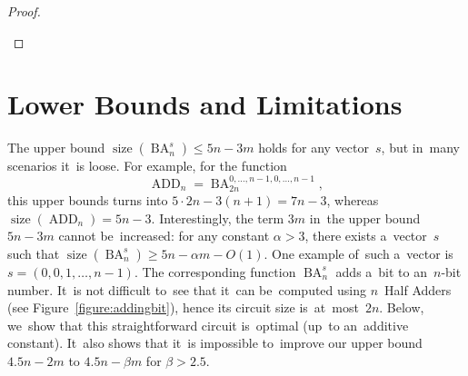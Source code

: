 \documentclass[sigconf, review, anonymous]{acmart}
\DeclareMathOperator{\ADD}{ADD}
\DeclareMathOperator{\BA}{BA}
\DeclareMathOperator{\size}{size}
\begin{document}
\begin{proof}
\begin{enumerate}
\begin{center}
        \end{center}
    \end{enumerate}
\end{proof}


\section{Lower Bounds and Limitations}
The upper bound $\size(\BA_n^s) \le 5n-3m$ holds for any vector~$s$, but 
in~many scenarios it~is loose. For example, for the function
\[\ADD_n=\BA_{2n}^{0,\dotsc,n-1,0,\dotsc,n-1},\]
this upper bounds turns into $5\cdot 2n-3(n+1)=7n-3$,
whereas $\size(\ADD_n)=5n-3$. Interestingly, the term $3m$ in~the upper bound $5n-3m$ cannot be~increased: for any constant $\alpha > 3$, there exists 
a~vector~$s$ such that $\size(\BA_n^s) \ge 5n-\alpha m-O(1)$. 
One example of~such a~vector is~$s=(0,0,1,\dotsc,n-1)$. The corresponding function $\BA_n^s$ adds a~bit to an~$n$-bit number. It~is not difficult to~see that it~can be~computed using $n$~Half Adders (see Figure~\ref{figure:addingbit}), hence its circuit size is~at~most~$2n$. Below, we~show that this straightforward circuit is~optimal (up~to an~additive constant). It~also shows that it~is
impossible to~improve our upper bound $4.5n-2m$ to $4.5n-\beta m$ for $\beta > 2.5$.
\end{document}
